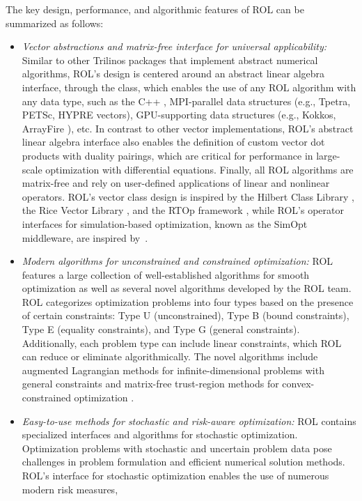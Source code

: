 The key design, performance, and algorithmic features of ROL can be
summarized as follows:
\begin{itemize}
\item
\emph{Vector abstractions and matrix-free interface for universal applicability:}
Similar to other Trilinos packages that implement abstract numerical
algorithms, ROL's design is centered around an abstract linear algebra
interface, through the  class, which enables the use of any
ROL algorithm with any data type, such as the C++ , MPI-parallel
data structures (e.g., Tpetra, PETSc, HYPRE vectors), GPU-supporting data
structures (e.g., Kokkos, ArrayFire \cite{Yalamanchili2015}), etc.
In contrast to other vector implementations, ROL's abstract linear algebra
interface also enables the definition of custom vector dot products with duality pairings,
which are critical for performance in large-scale optimization with differential equations.
Finally, all ROL algorithms are matrix-free and rely on user-defined
applications of linear and nonlinear operators.  ROL's vector class design is
inspired by the Hilbert Class Library \cite{hcl}, the Rice Vector Library \cite{rvl},
and the RTOp framework \cite{rtop}, while ROL's operator interfaces for
simulation-based optimization, known as the SimOpt middleware,
are inspired by~\cite{Heinkenschloss1999}.
\item
\emph{Modern algorithms for unconstrained and constrained optimization:}
ROL features a large collection of well-established algorithms for smooth
optimization as well as several novel algorithms developed by the ROL team.
ROL categorizes optimization problems into four types based on the
presence of certain constraints: Type U (unconstrained), Type B (bound
constraints), Type E (equality constraints), and Type G (general constraints).
Additionally, each problem type can include linear constraints, which ROL can
reduce or eliminate algorithmically. The novel algorithms include augmented
Lagrangian methods for infinite-dimensional problems with general constraints
\cite{ALESQP} and matrix-free trust-region methods for convex-constrained
optimization \cite{Kouri2022}.
\item
\emph{Easy-to-use methods for stochastic and risk-aware optimization:}
ROL contains specialized interfaces and algorithms for stochastic optimization.
Optimization problems with stochastic and uncertain problem data pose challenges
in problem formulation and efficient numerical solution methods.  ROL's interface
for stochastic optimization enables the use of numerous modern risk measures,

\end{itemize}
